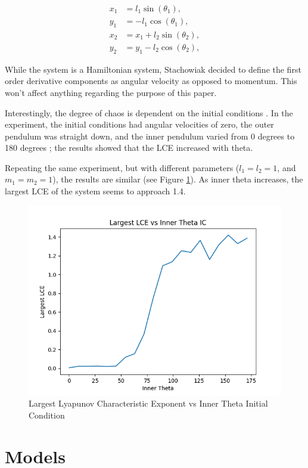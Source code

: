\documentclass{article}
\begin{document}
\begin{align}
    x_1 &= l_1 \sin(\theta_1), \nonumber \\
    y_1 &= - l_1 \cos(\theta_1), \nonumber \\
    x_2 &= x_1 + l_2 \sin(\theta_2), \nonumber \\
    y_2 &= y_1 - l_2 \cos(\theta_2), \label{eq:doub_pend_endpoints}
\end{align}


While the system is a Hamiltonian system, Stachowiak decided to define the first order 
derivative components as angular velocity as opposed to momentum. This won't affect
anything regarding the purpose of this paper.

Interestingly, the 
degree of chaos is dependent on the initial conditions \cite{levien1993double}. 
In the experiment, the initial conditions had angular velocities of zero, the outer 
pendulum was straight down, and the inner pendulum varied from 0 degrees to 180 degrees 
\cite{levien1993double}; the results showed that the LCE increased with theta. 

Repeating the same experiment, but with different parameters ($l_1 = l_2 = 1$, and
$m_1 = m_2 = 1$), the results are similar (see Figure \ref{fig:doub_pend_energy}).
As inner theta increases, the largest LCE of the system seems to
approach 1.4. %

\begin{figure}[H]
    \centering
    \includegraphics[width=.5\linewidth]{images/chaos_vs_energy_in_doub_pend.png}
    \caption{Largest Lyapunov Characteristic Exponent vs Inner Theta Initial Condition}
    \label{fig:doub_pend_energy}
\end{figure}

\section{Models}
\end{document}
